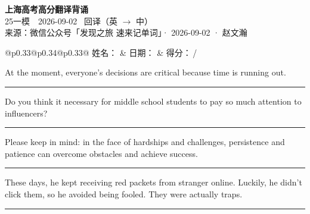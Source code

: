\documentclass[11pt,a4paper]{article}
\newcommand{\num}[1]{\makebox[1.9em][r]{#1.}\hspace{0.3em}}
\newcommand{\wline}{\noindent\rule{\linewidth}{0.4pt}}
\begin{document}
\pagestyle{plain}
\begin{center}
{\LARGE\bfseries 上海高考高分翻译背诵 }\\[0.25em]
{\large 25一模　2026-09-02 \quad\ 回译（英 $\to$ 中）}\\[0.35em]
{\footnotesize 来源：微信公众号「发现之旅 速来记单词」· 2026-09-02 · 赵文瀚}
\end{center}

\vspace{0.4em}
\noindent\begin{tabular}{@{}p{0.33\textwidth}@{}p{0.34\textwidth}@{}p{0.33\textwidth}@{}}
姓名：\underline{\hspace{2.0cm}} & 日期：\underline{\hspace{2.0cm}} & 得分：\underline{\hspace{1.4cm}}\,/ \\
\end{tabular}

\vspace{0.5em}

\vspace{0.8em}
\num{1}At the moment, everyone’s decisions are critical because time is running out.

\vspace{0.25em}

\wline

\num{2}Do you think it necessary for middle school students to pay so much attention to influencers?

\vspace{0.25em}

\wline

\num{3}Please keep in mind: in the face of hardships and challenges, persistence and patience can overcome obstacles and achieve success.

\vspace{0.25em}

\wline

\num{4}These days, he kept receiving red packets from stranger online. Luckily, he didn’t click them, so he avoided being fooled. They were actually traps.

\vspace{0.25em}

\wline
\end{document}
